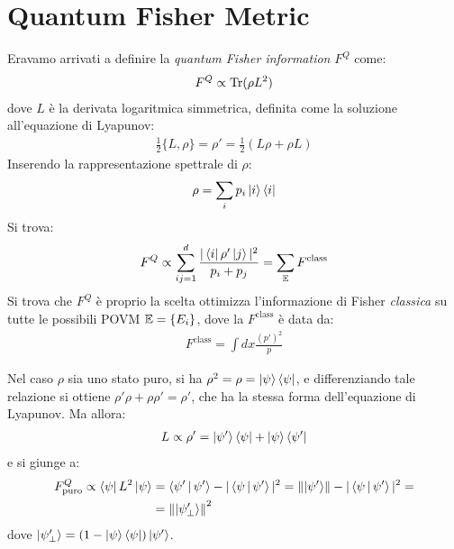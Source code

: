 \documentclass[../../InformazioneQuantistica.tex]{subfiles}
\begin{document}
\section{Quantum Fisher Metric}

Eravamo arrivati a definire la \textit{quantum Fisher information} $F^Q$ come:
\begin{align*}
F^Q \propto \operatorname{Tr}(\rho L^2)
\end{align*}
dove $L$ è la derivata logaritmica simmetrica, definita come la soluzione all'equazione di Lyapunov:
\begin{align*}
\frac{1}{2}\{ L,\rho\} = \rho' = \frac{1}{2}(L\rho + \rho L)
\end{align*}
Inserendo la rappresentazione spettrale di $\rho$:
\begin{align*}
\rho = \sum_i p_i \Ket{i}\Bra{i}
\end{align*}
Si trova:
\begin{align*}
F^Q \propto \sum_{ij=1}^d \frac{|\Bra{i}\rho'\Ket{j}|^2}{p_i + p_j} = \sum_{\mathbb{E}} F^{\mathrm{class}}
\end{align*}
Si trova che $F^Q$ è proprio la scelta ottimizza l'informazione di Fisher \textit{classica} su tutte le possibili POVM $\mathbb{E}=\{E_i\}$, dove la $F^{\mathrm{class}}$ è data da:
\begin{align*}
F^{\mathrm{class}} = \int dx \frac{(p')^2}{p}
\end{align*}

Nel caso $\rho$ sia uno stato puro, si ha $\rho^2 = \rho = \Ket{\psi}\Bra{\psi}$, e differenziando tale relazione si ottiene $\rho'\rho + \rho \rho' = \rho'$, che ha la stessa forma dell'equazione di Lyapunov. Ma allora:
\begin{align*}
L \propto \rho' = \Ket{\psi'}\Bra{\psi} + \Ket{\psi}\Bra{\psi'}
\end{align*}
e si giunge a:
\begin{align*}
F^{Q}_{\mathrm{puro}} \propto \Bra{\psi}L^2 \Ket{\psi} &= \Braket{\psi'|\psi'} - |\Braket{\psi|\psi'}|^2 = \left\lVert\Ket{\psi'}\right\rVert
-|\Braket{\psi|\psi'}|^2 =\\
&= \left\lVert\Ket{\psi_\perp'}\right\rVert^2
\end{align*}
dove $\Ket{\psi_\perp'}=(1-\Ket{\psi}\Bra{\psi})\Ket{\psi'}$.\\
\end{document}
